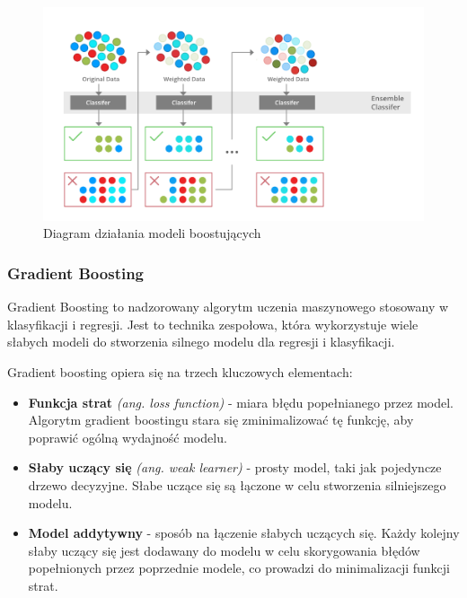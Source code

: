 \documentclass[12pt,a4paper]{article}
\begin{document}
\begin{figure}[H]
    \centering
    \includegraphics[width=1\linewidth]{images/boosting-diagram.png}
    \caption{Diagram działania modeli boostujących \cite{boosting-diagram}}
\end{figure}

\subsubsection{Gradient Boosting}
\label{sec:gradient-boosting}

Gradient Boosting to nadzorowany algorytm uczenia maszynowego stosowany w klasyfikacji i regresji. Jest to technika zespołowa, która wykorzystuje wiele słabych modeli do stworzenia silnego modelu dla regresji i klasyfikacji. \cite{gradient-boosting}


Gradient boosting opiera się na trzech kluczowych elementach:
\begin{itemize}
 \item \textbf{Funkcja strat} \textit{(ang. loss function)} -  miara błędu popełnianego przez model. Algorytm gradient boostingu stara się zminimalizować tę funkcję, aby poprawić ogólną wydajność modelu.
 
 \item \textbf{Słaby uczący się} \textit{(ang. weak learner)} - prosty model, taki jak pojedyncze drzewo decyzyjne. Słabe uczące się są łączone w celu stworzenia silniejszego modelu.
 
 \item \textbf{Model addytywny} - sposób na łączenie słabych uczących się. Każdy kolejny słaby uczący się jest dodawany do modelu w celu skorygowania błędów popełnionych przez poprzednie modele, co prowadzi do minimalizacji funkcji strat.
\end{itemize}
\end{document}
